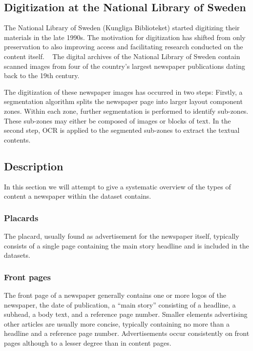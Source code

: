 \documentclass[english, bibtex]{kththesis}
\begin{document}
\subsection{Digitization at the National Library of Sweden}

The National Library of Sweden (Kungliga Biblioteket) started digitizing their materials in the late 1990s. The motivation for digitization has shifted from only preservation to also improving access and facilitating research conducted on the content itself. ~\cite{Rekathati_2020} The digital archives of the National Library of Sweden contain scanned images from four of the country’s largest newspaper publications dating back to the 19th century. 

The digitization of these newspaper images has occurred in two steps: Firstly, a segmentation algorithm splits the newspaper page into larger layout component zones. Within each zone, further segmentation is performed to identify sub-zones. These sub-zones may either be composed of images or blocks of text. In the second step, OCR is applied to the segmented sub-zones to extract the textual contents. 

\subsection{Description}

In this section we will attempt to give a systematic overview of the types of content a newspaper within the dataset contains. 

\subsubsection{Placards}

The placard, usually found as advertisement for the newspaper itself, typically consists of a single page containing the main story headline and is included in the datasets. 

\subsubsection{Front pages}

The front page of a newspaper generally contains one or more logos of the newspaper, the date of publication, a “main story” consisting of a headline, a subhead, a body text, and a reference page number. Smaller elements advertising other articles are usually more concise, typically containing no more than a headline and a reference page number. Advertisements occur consistently on front pages although to a lesser degree than in content pages. 
\end{document}
